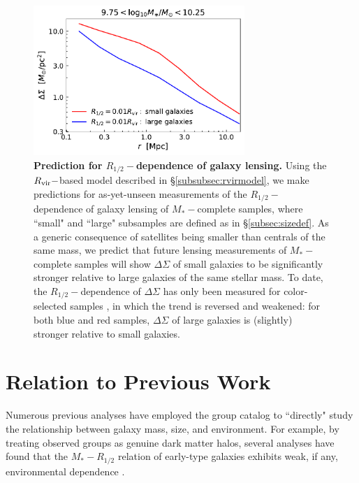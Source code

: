 \documentclass[usenatbib,usegraphicx,letterpaper]{mn2e}
\newcommand{\rhalf}{R_{1/2}}
\newcommand{\mstar}{M_{\ast}}
\newcommand{\rvir}{R_{\rm vir}}
\begin{document}
\begin{figure}
\centering
\includegraphics[width=8cm]{FIGS/rvir_only_lensing_prediction.pdf}
\caption{
{\bf Prediction for $\rhalf-$dependence of galaxy lensing.}
Using the $\rvir-$based model described in \S\ref{subsubsec:rvirmodel}, we make predictions for as-yet-unseen measurements of the $\rhalf-$dependence of galaxy lensing of $\mstar-$complete samples, where ``small" and ``large" subsamples are defined as in \S\ref{subsec:sizedef}. As a generic consequence of satellites being smaller than centrals of the same mass, we predict that future lensing measurements of $\mstar-$complete samples will show $\Delta\Sigma$ of small galaxies to be significantly stronger relative to large galaxies of the same stellar mass. To date, the $\rhalf-$dependence of $\Delta\Sigma$ has only been measured for color-selected samples \citep{charlton_etal17}, in which the trend is reversed and weakened: for both blue and red samples, $\Delta\Sigma$ of large galaxies is (slightly) stronger relative to small galaxies.
}
\label{fig:lensingprediction}
\end{figure}

\section{Relation to Previous Work}
\label{sec:previous_work}

Numerous previous analyses have employed the \citet{yang_etal05b} group catalog to ``directly" study the relationship between galaxy mass, size, and environment. For example, by treating observed groups as genuine dark matter halos, several analyses have found that the $\mstar-\rhalf$ relation of early-type galaxies exhibits weak, if any, environmental dependence \citep{weinmann_etal08,huertas_company_etal13b,shankar_etal14}. 
\end{document}
